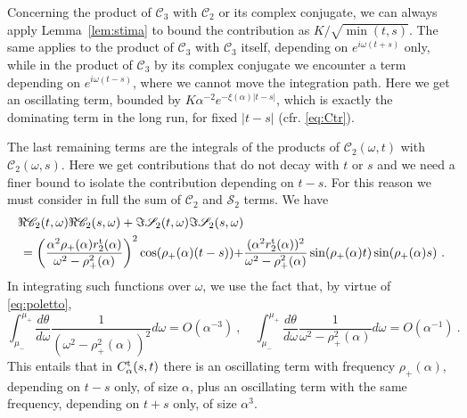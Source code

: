 \documentclass[11pt]{article}
\numberwithin{equation}{section}
\numberwithin{theorem}{section}
\newcommand{\gotK}{{\mathfrak K}}
\newcommand{\matC}{{\mathscr C}}
\newcommand{\matG}{{\mathscr G}}
\newcommand{\matS}{{\mathscr S}}
\begin{document}
Concerning the product of $\matC_3$ with $\matC_2$ or its complex conjugate, we can always apply Lemma~\ref{lem:stima}
to bound the contribution as $K/\sqrt{\min{(t,s)}}$. The same applies to the product of $\matC_3$ with $\matC_3$ itself,
depending on $e^{i\omega(t+s)}$ only, while in the product of $\matC_3$ by its complex conjugate we encounter a term
depending on $e^{i\omega(t-s)}$, where we cannot move the integration path. Here we get an oscillating term, bounded by
$K\alpha^{-2} e^{-\xi(\alpha)|t-s|}$, which is exactly the dominating term in the long run, for fixed $|t-s|$ (cfr.
\eqref{eq:Ctr}).

The last remaining terms are the integrals of the products of $\matC_2(\omega,t)$ with $\matC_2(\omega,s)$. Here we get
contributions that do not decay with $t$ or $s$ and we need a finer bound to isolate the contribution depending on
$t-s$. For this reason we must consider in full the sum of $\matC_2$ and $\matS_2$ terms. We have
\begin{equation*}
  \begin{split}
    \Re\matC_2(t,\omega)\Re\matC_2(s,\omega)+\Im\matS_2(t,\omega)\Im\matS_2(s,\omega)&\\
    =\left(\frac{\alpha^2 \rho_+(\alpha)r^{\rm 
t}_2(\alpha)}{\omega^2-\rho_+^2(\alpha)}\right)^2\cos(\rho_+(\alpha)(t-s))+&
\frac{(\alpha^2r^{\rm 
t}_2(\alpha))^2}{\omega^2-\rho_+^2(\alpha)}\sin(\rho_+(\alpha)t)
\sin(\rho_+(\alpha)s) \ .
  \end{split}
\end{equation*}
In integrating such functions over $\omega$, we use the fact that, by virtue of
\eqref{eq:poletto}, 
$$
\int_{\mu_-}^{\mu_+}
\frac{d\theta}{d\omega}\frac{1}{(\omega^2-\rho_+^2(\alpha))^2} d\omega
= O(\alpha^{-3})\ ,\quad \int_{\mu_-}^{\mu_+}
\frac{d\theta}{d\omega}\frac{1}{\omega^2-\rho_+^2(\alpha)} d\omega
= O(\alpha^{-1})\ .
$$
This entails that in $C^{\rm t}_\alpha(s,t)$ there is an
oscillating term  with frequency $\rho_+(\alpha)$, depending on $t-s$ only, of size $\alpha$, plus an oscillating term with the same frequency, depending on $t+s$ only, of
size $\alpha^3$. 

\end{document}
